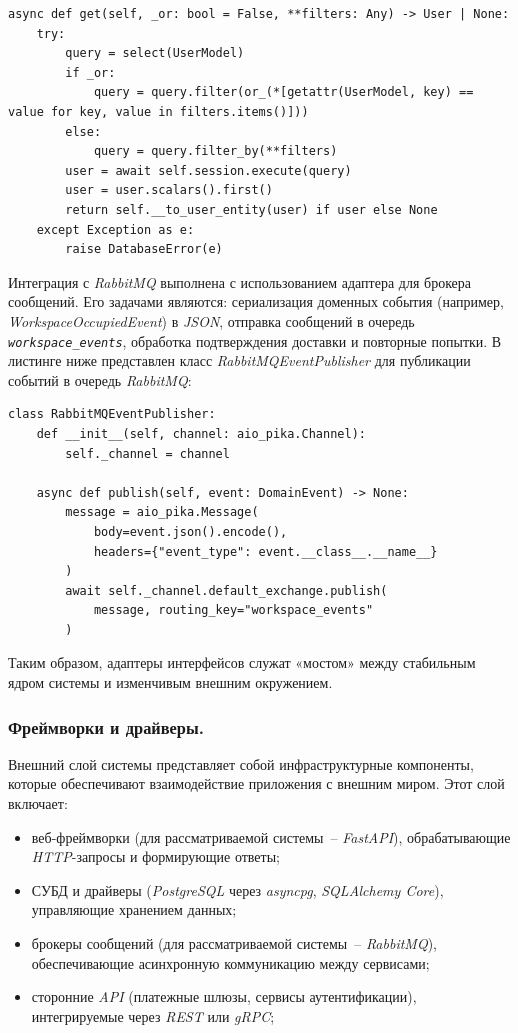 \begin{lstlisting}[style=pythonstyle]
async def get(self, _or: bool = False, **filters: Any) -> User | None:
    try:
        query = select(UserModel)
        if _or:
            query = query.filter(or_(*[getattr(UserModel, key) == value for key, value in filters.items()]))
        else:
            query = query.filter_by(**filters)
        user = await self.session.execute(query)
        user = user.scalars().first()
        return self.__to_user_entity(user) if user else None
    except Exception as e:
        raise DatabaseError(e)
\end{lstlisting}

Интеграция с \textit{RabbitMQ} выполнена с использованием адаптера для брокера сообщений. Его задачами являются: сериализация доменных события (например, \textit{WorkspaceOccupiedEvent}) в \textit{JSON}, отправка сообщений в очередь \textit{\lstinline!workspace_events!}, обработка подтверждения доставки и повторные попытки. В листинге ниже представлен класс \textit{RabbitMQEventPublisher} для публикации событий в очередь \textit{RabbitMQ}:

\begin{lstlisting}[style=pythonstyle]
class RabbitMQEventPublisher:
    def __init__(self, channel: aio_pika.Channel):
        self._channel = channel

    async def publish(self, event: DomainEvent) -> None:
        message = aio_pika.Message(
            body=event.json().encode(),
            headers={"event_type": event.__class__.__name__}
        )
        await self._channel.default_exchange.publish(
            message, routing_key="workspace_events"
        )
\end{lstlisting}

Таким образом, адаптеры интерфейсов служат «мостом» между стабильным ядром системы и изменчивым внешним окружением.

\subsubsection{Фреймворки и драйверы. }

Внешний слой системы представляет собой инфраструктурные компоненты, которые обеспечивают взаимодействие приложения с внешним миром. Этот слой включает:

\begin{itemize}
    \item веб-фреймворки (для рассматриваемой системы~-- \textit{FastAPI}), обрабатывающие \textit{HTTP}-запросы и формирующие ответы;
    \item СУБД и драйверы (\textit{PostgreSQL} через \textit{asyncpg}, \textit{SQLAlchemy Core}), управляющие хранением данных;
    \item брокеры сообщений (для рассматриваемой системы~-- \textit{RabbitMQ}), обеспечивающие асинхронную коммуникацию между сервисами;
    \item сторонние \textit{API} (платежные шлюзы, сервисы аутентификации), интегрируемые через \textit{REST} или \textit{gRPC};
\end{itemize}


